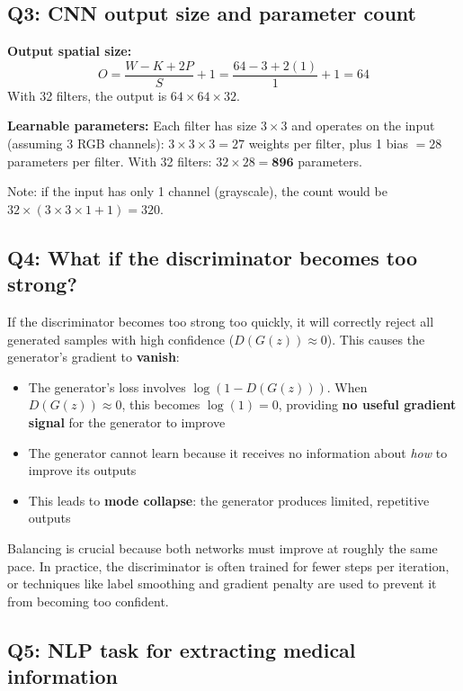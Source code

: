 \documentclass[11pt,a4paper]{article}
\begin{document}
\subsection*{Q3: CNN output size and parameter count}

\textbf{Output spatial size:}
\[
O = \frac{W - K + 2P}{S} + 1 = \frac{64 - 3 + 2(1)}{1} + 1 = 64
\]
With 32 filters, the output is $64 \times 64 \times 32$.

\textbf{Learnable parameters:} Each filter has size $3 \times 3$ and operates on the input (assuming 3 RGB channels): $3 \times 3 \times 3 = 27$ weights per filter, plus 1 bias $= 28$ parameters per filter. With 32 filters: $32 \times 28 = \mathbf{896}$ parameters.

Note: if the input has only 1 channel (grayscale), the count would be $32 \times (3 \times 3 \times 1 + 1) = 320$.

\subsection*{Q4: What if the discriminator becomes too strong?}

If the discriminator becomes too strong too quickly, it will correctly reject all generated samples with high confidence ($D(G(z)) \approx 0$). This causes the generator's gradient to \textbf{vanish}:

\begin{itemize}[leftmargin=1.5em]
    \item The generator's loss involves $\log(1 - D(G(z)))$. When $D(G(z)) \approx 0$, this becomes $\log(1) = 0$, providing \textbf{no useful gradient signal} for the generator to improve
    \item The generator cannot learn because it receives no information about \textit{how} to improve its outputs
    \item This leads to \textbf{mode collapse}: the generator produces limited, repetitive outputs
\end{itemize}

Balancing is crucial because both networks must improve at roughly the same pace. In practice, the discriminator is often trained for fewer steps per iteration, or techniques like label smoothing and gradient penalty are used to prevent it from becoming too confident.

\subsection*{Q5: NLP task for extracting medical information}
\end{document}
